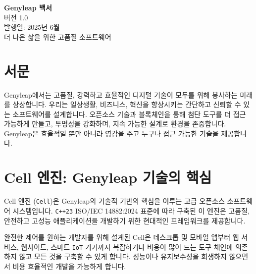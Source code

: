 \documentclass[a4paper,12pt,openany]{book}
\begin{document}
\begin{titlepage}
    \begin{center}
        \vspace*{1.5cm}
        {\Huge \textbf{Genyleap 백서}} \\
        \vspace{0.5cm}
        {\Large 버전 1.0} \\
        \vspace{0.5cm}
        {\large 발행일: 2025년 6월} \\
        \vspace{1.5cm}
        {\large 더 나은 삶을 위한 고품질 소프트웨어} \\
    \end{center}
    \vfill
\end{titlepage}

\chapter{서문}
Genyleap에서는 고품질, 강력하고 효율적인 디지털 기술이 모두를 위해 봉사하는 미래를 상상합니다. 우리는 일상생활, 비즈니스, 혁신을 향상시키는 간단하고 신뢰할 수 있는 소프트웨어를 설계합니다. 오픈소스 기술과 블록체인을 통해 첨단 도구를 더 접근 가능하게 만들고, 투명성을 강화하며, 지속 가능한 설계로 환경을 존중합니다. Genyleap은 효율적일 뿐만 아니라 영감을 주고 누구나 접근 가능한 기술을 제공합니다.

\chapter{Cell 엔진: Genyleap 기술의 핵심}

Cell 엔진 (\texttt{Cell})은 Genyleap의 기술적 기반의 핵심을 이루는 고급 오픈소스 소프트웨어 시스템입니다. \texttt{C++23} ISO/IEC 14882:2024 표준에 따라 구축된 이 엔진은 고품질, 안전하고 고성능 애플리케이션을 개발하기 위한 현대적인 프레임워크를 제공합니다.

완전한 제어를 원하는 개발자를 위해 설계된 Cell은 데스크톱 및 모바일 앱부터 웹 서비스, 웹사이트, 스마트 \texttt{IoT} 기기까지 복잡하거나 비용이 많이 드는 도구 체인에 의존하지 않고 모든 것을 구축할 수 있게 합니다. 성능이나 유지보수성을 희생하지 않으면서 비용 효율적인 개발을 가능하게 합니다.
\end{document}
